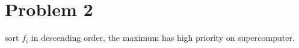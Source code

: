 \section{Problem 2}
sort  $f_i$ in descending order, the maximum has high priority on supercomputer.